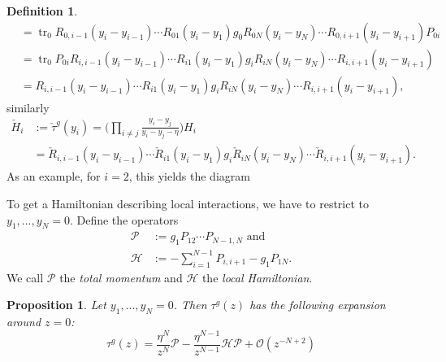 \documentclass[11pt]{report}
\newtheorem{prop}[theorem]{Proposition}
\theoremstyle{definition}
\newtheorem{definition}[theorem]{Definition}
\theoremstyle{remark}
\theoremstyle{remark}
\begin{document}
\begin{definition}
\begin{align*}
&= \operatorname{tr}_0 R_{0,i-1}(y_i-y_{i-1}) \cdots R_{01}(y_i-y_1) g_0 R_{0N}(y_i-y_N) \cdots R_{0,i+1}(y_i-y_{i+1}) P_{0i} \\
&= \operatorname{tr}_0 P_{0i} R_{i,i-1}(y_i-y_{i-1}) \cdots R_{i1}(y_i-y_1) g_i R_{iN}(y_i-y_N) \cdots R_{i,i+1}(y_i-y_{i+1}) \\
&= R_{i,i-1}(y_i-y_{i-1}) \cdots R_{i1}(y_i-y_1) g_i R_{iN}(y_i-y_N) \cdots R_{i,i+1}(y_i-y_{i+1}),
\end{align*}
similarly
\begin{align*}
\check H_i
&:= \check \tau^g(y_i) = \bigg( \prod_{i \neq j} \frac{y_i-y_j}{y_i-y_j-\eta} \bigg) H_i \\
&= \check R_{i,i-1}(y_i-y_{i-1}) \cdots \check R_{i1}(y_i-y_1) g_i \check R_{iN}(y_i-y_N) \cdots \check R_{i,i+1}(y_i-y_{i+1}).
\end{align*}
As an example, for $i=2$, this yields the diagram
~\\
\begin{center}
\end{center}
To get a Hamiltonian describing local interactions, we have to restrict to $y_1,...,y_N = 0$. Define the operators
\begin{align*}
\mathcal{P} &:= g_1 P_{12} \cdots P_{N-1,N} \text{ and} \\
\mathcal{H} &:= -\sum_{i=1}^{N-1} P_{i,i+1} - g_1 P_{1N}.
\end{align*}
We call $\mathcal{P}$ the \emph{total momentum} and $\mathcal{H}$ the \emph{local Hamiltonian}.
\end{definition}

\begin{prop}
Let $y_1,...,y_N = 0$. Then $\tau^g(z)$ has the following expansion around $z=0$:
\begin{equation*}
\tau^g(z) = \frac{\eta^N}{z^N} \mathcal{P} - \frac{\eta^{N-1}}{z^{N-1}} \mathcal{H} \mathcal{P} + \mathcal{O}(z^{-N+2})
\end{equation*}
\end{prop}
\end{document}
